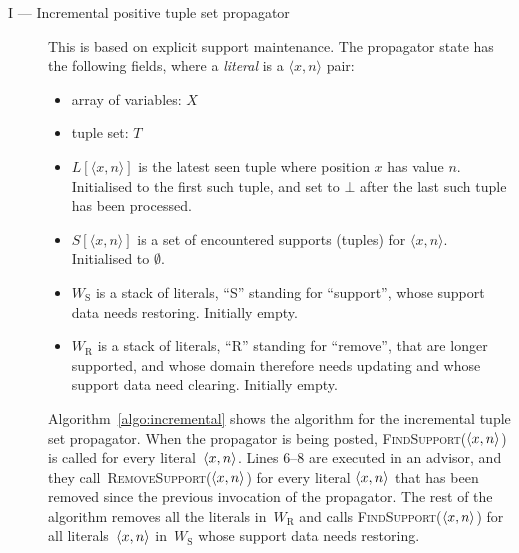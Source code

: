 \documentclass[a4paper,11pt]{article}
\theoremstyle{definition}
\newcommand{\Algoref}[1]{Algorithm~\ref{#1}}
\def\FindSupport{\textsc{Find\-Support}}
\def\RemoveSupport{\textsc{Remove\-Support}}
\numberwithin{equation}{section}
\begin{document}
\begin{description}
  \item[I --- Incremental positive tuple set propagator]
    This is based on explicit support maintenance.  The propagator state
has the following fields, where a \emph{literal} is a $\langle x,n
\rangle$ pair:

\begin{itemize}
\item array of variables: $X$
\item tuple set: $T$
\item $L[\langle x,n \rangle]$ is the latest seen tuple where position
  $x$ has value $n$.  Initialised to the first such tuple, and set to
  $\bot$ after the last such tuple has been processed.
\item $S[\langle x,n \rangle]$ is a set of encountered supports
  (tuples) for $\langle x,n \rangle$.  Initialised to $\emptyset$.
\item $W_\text{S}$ is a stack of literals, ``S'' standing for ``support'',
  whose support data needs restoring.
  Initially empty.
\item $W_\text{R}$ is a stack of literals, ``R'' standing for ``remove'',
  that are longer supported, and whose domain therefore needs updating
  and whose support data need clearing.
  Initially empty.
\end{itemize}

\Algoref{algo:incremental} shows the algorithm for the incremental
tuple set propagator. When the propagator is being posted,
\FindSupport($\left\langle x,n\right\rangle$)
is called for every literal~$\left\langle x,n\right\rangle$.
Lines $6$--$8$ are executed in an advisor, and they call~\RemoveSupport($\left\langle x,n\right\rangle$)
for every literal $\left\langle x,n\right\rangle$ that has been removed since the previous invocation
of the propagator.
The rest of the algorithm removes all the literals in~$W_\text{R}$ and calls
\FindSupport($\left\langle x,n\right\rangle$) for all literals~$\left\langle x,n\right\rangle$ in~$W_\text{S}$ whose
support data needs restoring.


\end{description}
\end{document}
